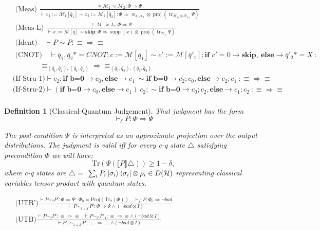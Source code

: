 \documentclass{report}
\newtheorem{definition}{Definition}[section]
\theoremstyle{defn_style}
\begin{document}
$\begin{aligned}
& \text { ({Meas}) } \frac{\vDash \mathcal{M}_1 \approx \mathcal{M}_2: \Phi \Longrightarrow\Psi}{\vdash x_1:=\mathcal{M}_1[\bar{q}_1] \sim x_2:=\mathcal{M}_2[\bar{q}_2]: \Phi \Longrightarrow \equiv_{x_1,x_2}\otimes\operatorname{proj}\left(\operatorname{tr}_{\mathcal{H}_{x_1}\otimes\mathcal{H}_{x_2} }\Psi\right)} \\ 
& \text { (Meas-L) } \frac{\vDash \mathcal{M}_1 \approx I_2: \Phi \Longrightarrow\Psi }{\vdash x:=\mathcal{M}[\bar{q}]  \sim \textbf{skip}: \Phi \Longrightarrow \operatorname{supp}(x)\otimes\operatorname{proj}\left(\operatorname{tr}_{\mathcal{H}_{x}}\Psi\right)}\\
& \text { (Ident)} \quad \vdash P\sim P : \equiv \Longrightarrow  \equiv\\
& \text { (CNOT)} \quad \vdash \bar{q}_1,\bar{q}_2*=CNOT;c:= \mathcal{M}[\bar{q}_1]\sim c':= \mathcal{M}[\bar{q}'_1]; \textbf{if }c'=0\rightarrow\textbf{skip},~\textbf{else}\rightarrow\bar{q}'_2*=X~ : \\
&~~~~~~~~~~~~~~~~~\equiv_{(\bar{q}_1,\bar{q}_2),(\bar{q}_1,\bar{q}_2)} \Longrightarrow  \equiv_{(\bar{q}_1,\bar{q}_2),(\bar{q}_1,\bar{q}_2)}\\
& \text{(If-Stru-1)} \vdash c_2; \textbf{if b=0}\rightarrow c_0, \textbf{else}\rightarrow c_1~\sim \textbf{if b=0}\rightarrow c_2;c_0, \textbf{else}\rightarrow c_2;c_1 ~ : \equiv \Longrightarrow  \equiv\\
& \text{(If-Stru-2)} \vdash  (\textbf{if b=0}\rightarrow c_0, \textbf{else}\rightarrow c_1)~c_2;\sim \textbf{if b=0}\rightarrow c_0;c_2, \textbf{else}\rightarrow c_1;c_2 ~ : \equiv \Longrightarrow  \equiv\\
\end{aligned}$
\begin{definition}[Classical-Quantum Judgement]
That judgment has the form
$$
\vdash_{ \delta} P: \Phi \Longrightarrow \Psi
$$

The post-condition $\Psi$ is interpreted as an approximate projection over the output distributions. The judgment is valid iff for every c-q state $\triangle$ satisfying precondition $\Phi$ we will have: 
$$
\text{Tr}(\Psi\left(\llbracket P \rrbracket{\triangle}\right))\geq1-\delta,
$$
where c-q states are  $\triangle =$ $\sum_iP_i\ket{\sigma_i}\bra{\sigma_i}\otimes \rho_i\in D(\mathcal{H})$ representing classical variables tensor product with quantum states. 
\end{definition}

$\begin{aligned}
&\text { ({UTB'})} \frac{\vdash P \sim_{\delta} P': \Phi \Longrightarrow \Psi~~~\Phi_0 = \text{Proj}(\text{Tr}_2(\Phi))
\quad \vdash_{\delta^{\prime}} P: \Phi_0 \Longrightarrow \neg bad}{\vdash P \sim_{\delta+\delta^{\prime}} P': \Phi \Longrightarrow \Psi\land(\neg bad\otimes I)}\\
& \text { ({UTB})} \frac{\vdash P \sim_{\delta} P': \equiv \Longrightarrow \equiv~~~\vdash P\sim_{\delta'} P'_1: \equiv \Longrightarrow \equiv \land (\neg bad\otimes I)}{\vdash P'_1 \sim_{\delta+\delta^{\prime}} P': \equiv \Longrightarrow \equiv\land(\neg bad\otimes I)}\\
\end{aligned}$
\end{document}
